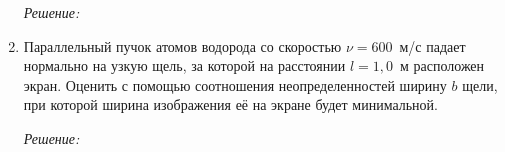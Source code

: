 \begin{enumerate}
\emph{Решение:}

\newpage

\item Параллельный пучок атомов водорода со скоростью \( \nu = 600 \)~м/с падает
нормально на узкую щель, за которой 	на расстоянии \( l = 1,\!0 \)~м расположен
экран. Оценить с помощью соотношения неопределенностей ширину \( b \) щели, при
которой ширина изображения её на экране будет минимальной.

\emph{Решение:}

\end{enumerate}
